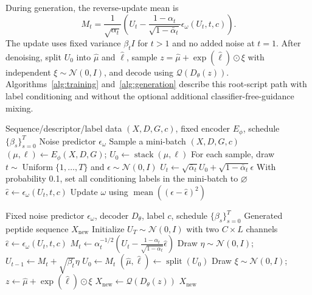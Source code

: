 \documentclass[journal]{IEEEtran}
\begin{document}
During generation, the reverse-update mean is
\begin{equation}
 M_t=\frac{1}{\sqrt{\alpha_t}}\left(U_t-\frac{1-\alpha_t}{\sqrt{1-\bar\alpha_t}}\epsilon_\omega(U_t,t,c)\right).
\end{equation}
The update uses fixed variance $\beta_t I$ for $t>1$ and no added noise at $t=1$. After denoising, split $U_0$ into $\widehat\mu$ and $\widehat\ell$, sample $z=\widehat\mu+\exp(\widehat\ell)\odot\xi$ with independent $\xi\sim\mathcal{N}(0,I)$, and decode using $\mathcal{Q}(D_\theta(z))$. Algorithms~\ref{alg:training} and~\ref{alg:generation} describe this root-script path with label conditioning and without the optional additional classifier-free-guidance mixing.

\begin{algorithm}[!t]
\caption{Parameter-space diffusion training in the retrieved implementation}
\label{alg:training}
\begin{algorithmic}[1]
\REQUIRE Sequence/descriptor/label data $(X,D,G,c)$, fixed encoder $E_\phi$, schedule $\{\beta_s\}_{s=0}^{T}$
\ENSURE Noise predictor $\epsilon_\omega$
\REPEAT
\STATE Sample a mini-batch $(X,D,G,c)$
\STATE $(\mu,\ell)\leftarrow E_\phi(X,D,G)$; $U_0\leftarrow\operatorname{stack}(\mu,\ell)$
\STATE For each sample, draw $t\sim\operatorname{Uniform}\{1,\ldots,T\}$ and $\epsilon\sim\mathcal{N}(0,I)$
\STATE $U_t\leftarrow\sqrt{\bar\alpha_t}U_0+\sqrt{1-\bar\alpha_t}\epsilon$
\STATE With probability 0.1, set all conditioning labels in the mini-batch to $\varnothing$
\STATE $\widehat\epsilon\leftarrow\epsilon_\omega(U_t,t,c)$
\STATE Update $\omega$ using $\operatorname{mean}((\epsilon-\widehat\epsilon)^2)$
\end{algorithmic}
\end{algorithm}

\begin{algorithm}[!t]
\caption{Parameter generation followed by latent sampling and decoding}
\label{alg:generation}
\begin{algorithmic}[1]
\REQUIRE Fixed noise predictor $\epsilon_\omega$, decoder $D_\theta$, label $c$, schedule $\{\beta_s\}_{s=0}^{T}$
\ENSURE Generated peptide sequence $X_{\mathrm{new}}$
\STATE Initialize $U_T\sim\mathcal{N}(0,I)$ with two $C\times L$ channels
\STATE $\widehat\epsilon\leftarrow\epsilon_\omega(U_t,t,c)$
\STATE $M_t\leftarrow\alpha_t^{-1/2}\left(U_t-\frac{1-\alpha_t}{\sqrt{1-\bar\alpha_t}}\widehat\epsilon\right)$
\STATE Draw $\eta\sim\mathcal{N}(0,I)$; $U_{t-1}\leftarrow M_t+\sqrt{\beta_t}\eta$
\ELSE
\STATE $U_0\leftarrow M_t$
\ENDIF
\ENDFOR
\STATE $(\widehat\mu,\widehat\ell)\leftarrow\operatorname{split}(U_0)$
\STATE Draw $\xi\sim\mathcal{N}(0,I)$; $z\leftarrow\widehat\mu+\exp(\widehat\ell)\odot\xi$
\STATE $X_{\mathrm{new}}\leftarrow\mathcal{Q}(D_\theta(z))$
\RETURN $X_{\mathrm{new}}$
\end{algorithmic}
\end{algorithm}
\end{document}
